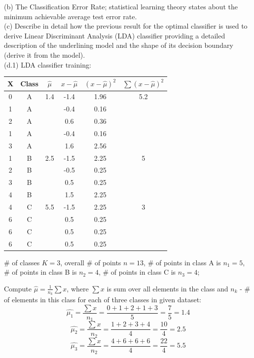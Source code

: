 \documentclass[a4paper,12pt,titlepage]{article} %
\begin{document}
(b) The Classification Error Rate;
statistical learning theory states about the minimum achievable average test error rate.\\

(c) Describe in detail how the previous result for the optimal classifier is used to derive Linear Discriminant Analysis (LDA) classifier providing a detailed description of the underlining model and the shape of its decision boundary (derive it from the model).\\

(d.1) LDA classifier training: 

\begin{center}
  \begin{tabular}{c|c||c|c|c|c}
    X & Class & $ \hat{\mu} $ & $ x - \hat{\mu} $ & $(x - \hat{\mu})^{2} $ & $ \sum{(x - \hat{\mu})^{2}} $\\
    \hline
    \hline
    0 & A & 1.4 & -1.4 & 1.96 & 5.2 \\
    1 & A &     & -0.4 & 0.16 &     \\
    2 & A &     &  0.6 & 0.36 &     \\
    1 & A &     & -0.4 & 0.16 &     \\
    3 & A &     &  1.6 & 2.56 &     \\
    \hline
    1 & B & 2.5 & -1.5 & 2.25 & 5 \\
    2 & B &     & -0.5 & 0.25 &   \\
    3 & B &     &  0.5 & 0.25 &   \\
    4 & B &     &  1.5 & 2.25 &   \\   
    \hline
    4 & C & 5.5 & -1.5 & 2.25 & 3 \\
    6 & C &     &  0.5 & 0.25 &   \\
    6 & C &     &  0.5 & 0.25 &   \\
    6 & C &     &  0.5 & 0.25 &   \\
    \hline
  \end{tabular}
\end{center}

\# of classes $ K= 3$, overall \# of points $ n = 13$, \# of points in class A is $ n_{1}= 5$, \# of points in class B is $ n_{2} = 4$, \# of points in class C is $ n_{3} = 4$;

Compute $ \hat{\mu} = \frac{1}{n_{k}} \sum{x} $, where $ \sum{x} $ is sum over all elements in the class and $ n_{k} $ - \# of elements in this class for each of three classes in given dataset:
$$ \hat{\mu_{1}} = \frac{\sum{x} }{n_{1} } = \frac{0+1+2+1+3}{5} = \frac{7}{5} = 1.4 $$
$$ \hat{\mu_{2}} = \frac{\sum{x} }{n_{2} } = \frac{1+2+3+4}{4} = \frac{10}{4} = 2.5 $$
$$ \hat{\mu_{3}} = \frac{\sum{x} }{n_{2} } = \frac{4+6+6+6}{4} = \frac{22}{4} = 5.5 $$\\
\end{document}
